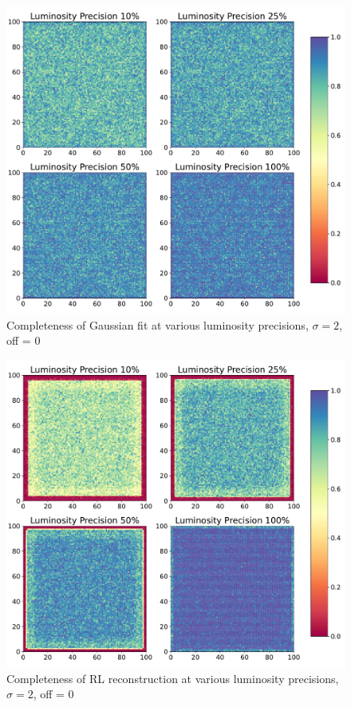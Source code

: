 \documentclass[a4paper]{article}
\begin{document}
			\begin{figure}[h!]
				\centering
				\includegraphics[width=0.6\linewidth]{gauss2_boards_gauss.pdf}
				\caption{Completeness of Gaussian fit at various luminosity precisions, $\sigma = 2$, off = 0}
				\label{fig:gbg}
			\end{figure}
			\begin{figure}[h!]
				\centering
				\includegraphics[width=0.6\linewidth]{gauss2_boards_lucy.pdf}
				\caption{Completeness of RL reconstruction at various luminosity precisions, $\sigma = 2$, off = 0}
				\label{fig:gbl}
			\end{figure}
	
\end{document}

